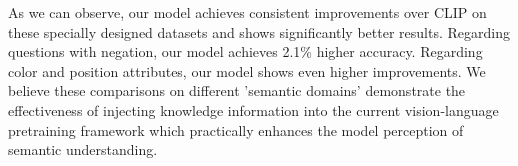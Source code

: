 As we can observe, our model achieves consistent improvements over CLIP on these specially designed datasets and shows significantly better results. Regarding questions with negation, our model achieves 2.1\% higher accuracy. Regarding color and position attributes, our model shows even higher improvements. We believe these comparisons on different 'semantic domains' demonstrate the effectiveness of injecting knowledge information into the current vision-language pretraining framework which practically enhances the model perception of semantic understanding. 



